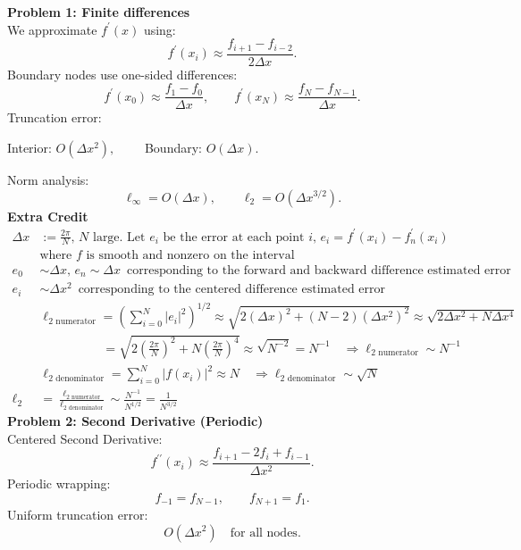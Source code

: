 \documentclass[11pt]{article}
\begin{document}
\textbf{Problem 1: Finite differences}\\
We approximate $f^\prime(x)$ using: 
$$f^\prime(x_i)\approx \frac{f_{i+1}-f_{i-2}}{2\Delta x}.$$ 
Boundary nodes use one-sided differences: 
$$f^\prime(x_0)\approx \frac{f_1-f_0}{\Delta x},\qquad f^\prime(x_N)\approx\frac{f_N - f_{N-1}}{\Delta x}.$$ 
Truncation error: \\
\begin{center} Interior: $O(\Delta x^2),\qquad$ Boundary: $O(\Delta x).$\end{center}
Norm analysis: 
$$\ell_\infty = O(\Delta x),\qquad \ell_2 = O(\Delta x^{3/2}).$$
\textbf{Extra Credit} 
\begin{align*}
    \Delta x&:=\frac{2\pi}{N},\,N\text{ large. Let }e_i\text{ be the error at each point }i,\,e_i=f^\prime(x_i)-f_n^\prime(x_i)\\
   &\text{where }f\text{ is smooth and nonzero on the interval}\\
    e_0&\sim\Delta x,\,e_n\sim\Delta x\,\text{ corresponding to the forward and backward difference estimated error}\\
    e_i&\sim\Delta x^2\, \text{ corresponding to the centered difference estimated error}\\
    &\ell_{2\text{ numerator}}=\left(\sum_{i=0}^N |e_i|^2 \right)^{1/2}\approx \sqrt{2(\Delta x)^2+(N-2)(\Delta x^2)^2}\approx \sqrt{2\Delta x^2+N\Delta x^4}\\
    &\qquad\qquad\quad= \sqrt{2\left(\frac{2\pi}{N}\right)^2+N\left(\frac{2\pi}{N}\right)^4} \approx\sqrt{N^{-2}}=N^{-1}\quad \Rightarrow \ell_{2\text{ numerator}}\sim N^{-1}\\
    &\ell_{2\text{ denominator}}=\sum_{i=0}^N|f(x_i)|^2\approx N\quad \Rightarrow \ell_{2\text{ denominator}}\sim\sqrt{N}\\
    \ell_2&=\frac{\ell_{2\text{ numerator}}}{\ell_{2\text{ denominator}}}\sim\frac{N^{-1}}{N^{1/2}}=\frac{1}{N^{3/2}}
\end{align*}
\newpage
\textbf{Problem 2: Second Derivative (Periodic)}\\
Centered Second Derivative: 
$$ f^{\prime\prime}(x_i)\approx \frac{f_{i+1} -2f_i + f_{i-1}}{\Delta x^2}.$$
Periodic wrapping:
$$f_{-1} = f_{N-1},\qquad f_{N+1}=f_1.$$
Uniform truncation error:
$$O(\Delta x^2)\quad\text{for all nodes.}$$
\end{document}
